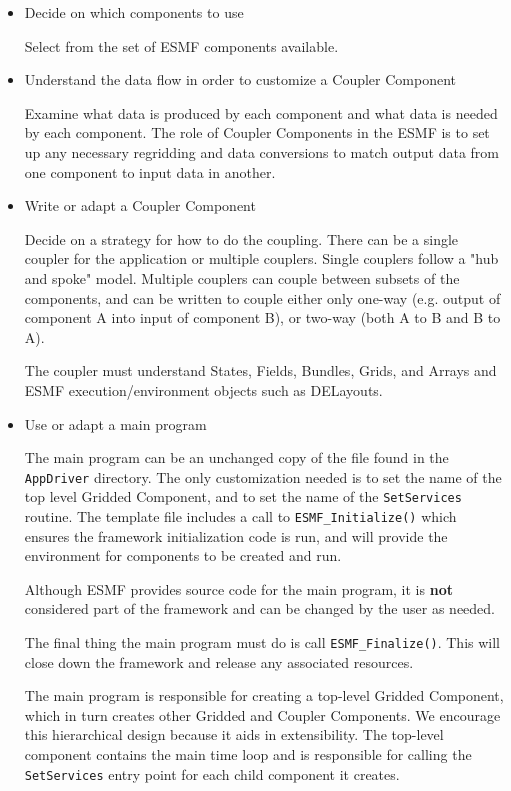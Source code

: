 \begin{itemize}

\item Decide on which components to use 

Select from the set of ESMF components available.

\item Understand the data flow in order to customize a Coupler Component

Examine what data is produced by each component and what data is
needed by each component.  The role of Coupler Components in the
ESMF is to set up any necessary regridding and data conversions
to match output data from one component to input data in another.

\item Write or adapt a Coupler Component

Decide on a strategy for how to do the coupling.  There can be a single
coupler for the application or multiple couplers.
Single couplers follow a "hub and
spoke" model.
Multiple couplers can couple between subsets of the components, and
can be written to couple either only one-way
(e.g. output of component A into input of component B), or two-way
(both A to B and B to A).  

The coupler must understand States, Fields, Bundles, 
Grids, and Arrays and ESMF execution/environment objects
such as DELayouts.    

\item Use or adapt a main program 

The main program can be an unchanged copy of the file found in
the {\tt AppDriver} directory.  The only customization needed is to
set the name of the top level Gridded Component, and to set the
name of the {\tt SetServices} routine.  The template file includes
a call to {\tt ESMF\_Initialize()} which ensures the framework
initialization code is run, and will
provide the environment for components to be created and run.

Although ESMF provides source code for the main program, it is
{\bf not} considered part of the framework and can be changed by
the user as needed.

The final thing the main program must do is call {\tt ESMF\_Finalize()}.
This will close down the framework and release any associated resources.

The main program is responsible for creating a top-level
Gridded Component, which in turn creates other Gridded and Coupler 
Components.  We encourage this hierarchical design because it
aids in extensibility.
The top-level component contains the main time loop and is 
responsible for calling the
{\tt SetServices} entry point for each child component it creates.

\end{itemize}



